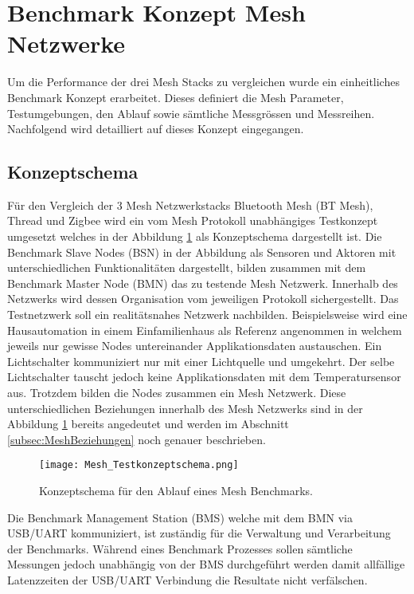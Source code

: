 \clearpage
\section{Benchmark Konzept Mesh Netzwerke}\label{sec:BenchmarkKonzeptMeshNetzwerke}

Um die Performance der drei Mesh Stacks zu vergleichen wurde ein einheitliches Benchmark Konzept erarbeitet. Dieses definiert die Mesh Parameter, Testumgebungen, den Ablauf sowie sämtliche Messgrössen und Messreihen. Nachfolgend wird detailliert auf dieses Konzept eingegangen.

\subsection{Konzeptschema}\label{subsec:KonzeptschemaMesh}

Für den Vergleich der 3 Mesh Netzwerkstacks Bluetooth Mesh (BT Mesh), Thread und Zigbee wird ein vom Mesh Protokoll unabhängiges Testkonzept umgesetzt welches in der Abbildung \ref{fig:MeshTestKonzept} als Konzeptschema dargestellt ist. Die Benchmark Slave Nodes (BSN) in der Abbildung als Sensoren und Aktoren mit unterschiedlichen Funktionalitäten dargestellt, bilden zusammen mit dem Benchmark Master Node (BMN) das zu testende Mesh Netzwerk. Innerhalb des Netzwerks wird dessen Organisation vom jeweiligen Protokoll sichergestellt. Das Testnetzwerk soll ein realitätsnahes Netzwerk nachbilden. Beispielsweise wird eine Hausautomation in einem Einfamilienhaus als Referenz angenommen in welchem jeweils nur gewisse Nodes untereinander Applikationsdaten austauschen. Ein Lichtschalter kommuniziert nur mit einer Lichtquelle und umgekehrt. Der selbe Lichtschalter tauscht jedoch keine Applikationsdaten mit dem Temperatursensor aus. Trotzdem bilden die Nodes zusammen ein Mesh Netzwerk. Diese unterschiedlichen Beziehungen innerhalb des Mesh Netzwerks sind in der Abbildung \ref{fig:MeshTestKonzept} bereits angedeutet und werden im Abschnitt \ref{subsec:MeshBeziehungen} noch genauer beschrieben.

\begin{figure}[h]
	\centering
	\texttt{[image: Mesh\_Testkonzeptschema.png]}
	\caption{Konzeptschema für den Ablauf eines Mesh Benchmarks.}\label{fig:MeshTestKonzept}
\end{figure}

Die Benchmark Management Station (BMS) welche mit dem BMN via USB/UART kommuniziert, ist zuständig für die Verwaltung und Verarbeitung der Benchmarks. Während eines Benchmark Prozesses sollen sämtliche Messungen jedoch unabhängig von der BMS durchgeführt werden damit allfällige Latenzzeiten der USB/UART Verbindung die Resultate nicht verfälschen.

